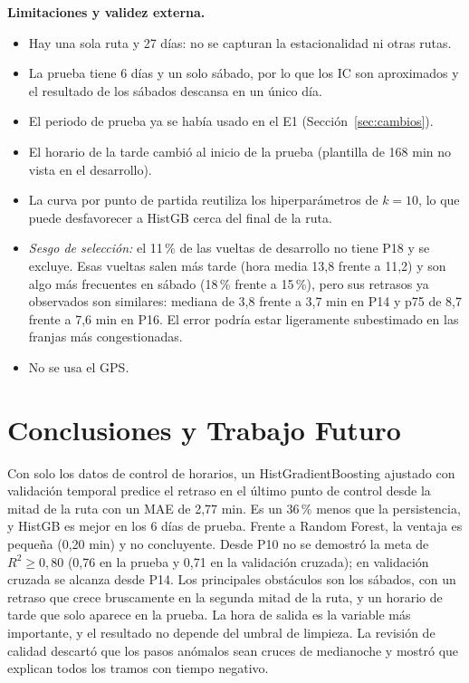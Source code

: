 \documentclass[conference,spanish]{IEEEtran}
\begin{document}
\textbf{Limitaciones y validez externa.}
\begin{itemize}
    \item Hay una sola ruta y 27 días: no se capturan la estacionalidad ni otras rutas.
    \item La prueba tiene 6 días y un solo sábado, por lo que los IC son aproximados y el resultado de los sábados descansa en un único día.
    \item El periodo de prueba ya se había usado en el E1 (Sección~\ref{sec:cambios}).
    \item El horario de la tarde cambió al inicio de la prueba (plantilla de 168 min no vista en el desarrollo).
    \item La curva por punto de partida reutiliza los hiperparámetros de $k=10$, lo que puede desfavorecer a HistGB cerca del final de la ruta.
    \item \emph{Sesgo de selección:} el 11\,\% de las vueltas de desarrollo no tiene P18 y se excluye. Esas vueltas salen más tarde (hora media 13,8 frente a 11,2) y son algo más frecuentes en sábado (18\,\% frente a 15\,\%), pero sus retrasos ya observados son similares: mediana de 3,8 frente a 3,7 min en P14 y p75 de 8,7 frente a 7,6 min en P16. El error podría estar ligeramente subestimado en las franjas más congestionadas.
    \item No se usa el GPS.
\end{itemize}

\section{Conclusiones y Trabajo Futuro}

Con solo los datos de control de horarios, un HistGradientBoosting ajustado con validación temporal predice el retraso en el último punto de control desde la mitad de la ruta con un MAE de 2,77 min. Es un 36\,\% menos que la persistencia, y HistGB es mejor en los 6 días de prueba. Frente a Random Forest, la ventaja es pequeña (0,20 min) y no concluyente. Desde P10 no se demostró la meta de $R^2\ge0{,}80$ (0,76 en la prueba y 0,71 en la validación cruzada); en validación cruzada se alcanza desde P14. Los principales obstáculos son los sábados, con un retraso que crece bruscamente en la segunda mitad de la ruta, y un horario de tarde que solo aparece en la prueba. La hora de salida es la variable más importante, y el resultado no depende del umbral de limpieza. La revisión de calidad descartó que los pasos anómalos sean cruces de medianoche y mostró que explican todos los tramos con tiempo negativo.
\end{document}

